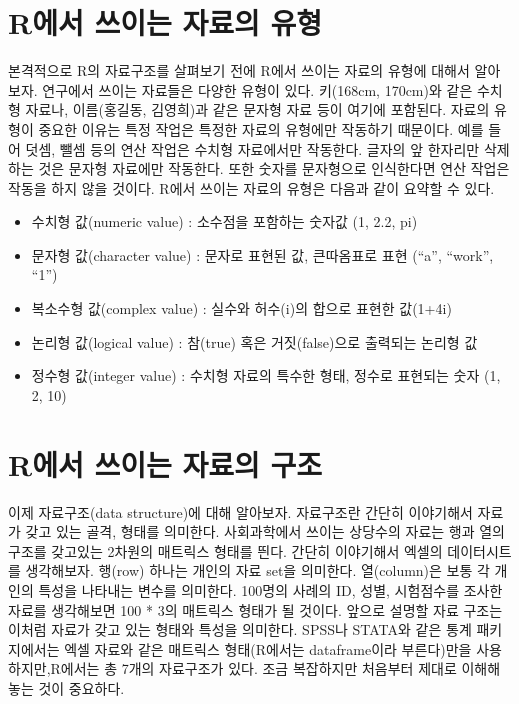 \documentclass[
]{book}
\providecommand{\tightlist}{%
  \setlength{\itemsep}{0pt}\setlength{\parskip}{0pt}}
\theoremstyle{definition}
\theoremstyle{definition}
\theoremstyle{definition}
\theoremstyle{definition}
\theoremstyle{remark}
\begin{document}
\hypertarget{ruxc5d0uxc11c-uxc4f0uxc774uxb294-uxc790uxb8ccuxc758-uxc720uxd615}{%
\section{R에서 쓰이는 자료의 유형}\label{ruxc5d0uxc11c-uxc4f0uxc774uxb294-uxc790uxb8ccuxc758-uxc720uxd615}}

본격적으로 R의 자료구조를 살펴보기 전에 R에서 쓰이는 자료의 유형에 대해서 알아보자. 연구에서 쓰이는 자료들은 다양한 유형이 있다. 키(168cm, 170cm)와 같은 수치형 자료나, 이름(홍길동, 김영희)과 같은 문자형 자료 등이 여기에 포함된다. 자료의 유형이 중요한 이유는 특정 작업은 특정한 자료의 유형에만 작동하기 때문이다. 예를 들어 덧셈, 뺄셈 등의 연산 작업은 수치형 자료에서만 작동한다. 글자의 앞 한자리만 삭제하는 것은 문자형 자료에만 작동한다. 또한 숫자를 문자형으로 인식한다면 연산 작업은 작동을 하지 않을 것이다. R에서 쓰이는 자료의 유형은 다음과 같이 요약할 수 있다.

\begin{itemize}
\tightlist
\item
  수치형 값(numeric value) : 소수점을 포함하는 숫자값 (1, 2.2, pi)
\item
  문자형 값(character value) : 문자로 표현된 값, 큰따옴표로 표현 (``a'', ``work'', ``1'')
\item
  복소수형 값(complex value) : 실수와 허수(i)의 합으로 표현한 값(1+4i)
\item
  논리형 값(logical value) : 참(true) 혹은 거짓(false)으로 출력되는 논리형 값
\item
  정수형 값(integer value) : 수치형 자료의 특수한 형태, 정수로 표현되는 숫자 (1, 2, 10)
\end{itemize}

\hypertarget{ruxc5d0uxc11c-uxc4f0uxc774uxb294-uxc790uxb8ccuxc758-uxad6cuxc870}{%
\section{R에서 쓰이는 자료의 구조}\label{ruxc5d0uxc11c-uxc4f0uxc774uxb294-uxc790uxb8ccuxc758-uxad6cuxc870}}

이제 자료구조(data structure)에 대해 알아보자. 자료구조란 간단히 이야기해서 자료가 갖고 있는 골격, 형태를 의미한다. 사회과학에서 쓰이는 상당수의 자료는 행과 열의 구조를 갖고있는 2차원의 매트릭스 형태를 띈다. 간단히 이야기해서 엑셀의 데이터시트를 생각해보자. 행(row) 하나는 개인의 자료 set을 의미한다. 열(column)은 보통 각 개인의 특성을 나타내는 변수를 의미한다. 100명의 사례의 ID, 성별, 시험점수를 조사한 자료를 생각해보면 100 * 3의 매트릭스 형태가 될 것이다.
앞으로 설명할 자료 구조는 이처럼 자료가 갖고 있는 형태와 특성을 의미한다. SPSS나 STATA와 같은 통계 패키지에서는 엑셀 자료와 같은 매트릭스 형태(R에서는 dataframe이라 부른다)만을 사용하지만,R에서는 총 7개의 자료구조가 있다. 조금 복잡하지만 처음부터 제대로 이해해놓는 것이 중요하다.
\end{document}
